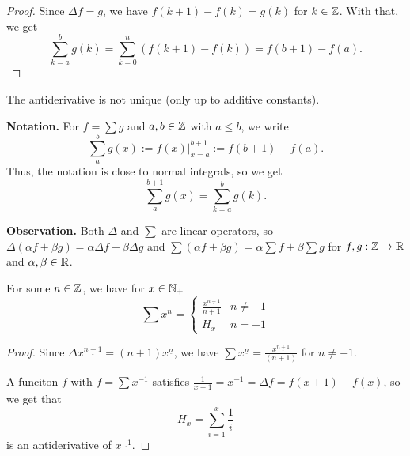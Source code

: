 \documentclass[language=english]{../../Template/TemplateLecture}
\begin{document}
\begin{proof}
    Since $\Delta f = g$, we have $f(k+1) - f(k) = g(k)$ for $k \in \mathbb{Z}$. With that, we get 
    \begin{equation}
        \sum_{k = a}^b g(k) = \sum_{k = 0}^n (f(k+1) - f(k)) = f(b+1) - f(a).
    \end{equation}
\end{proof}

The antiderivative is not unique (only up to additive constants).

\textbf{Notation.} For $f = \sum g$ and $a, b \in \mathbb{Z}$ with $a \leq b$, we write
\begin{equation}
    \sum_a^b g(x) := f(x)\Big|_{x = a}^{b + 1} := f(b+1) - f(a).
\end{equation}
Thus, the notation is close to normal integrals, so we get 
\begin{equation}
    \sum_a^{b+1} g(x) = \sum_{k = a}^b g(k).
\end{equation}




\textbf{Observation.} Both $\Delta$ and $\sum$ are linear operators, so $\Delta(\alpha f + \beta g) = \alpha \Delta f + \beta \Delta g$ and $\sum(\alpha f + \beta g) = \alpha\sum f + \beta\sum g$ for $f, g: \mathbb{Z} \to \mathbb{R}$ and $\alpha,\beta \in \mathbb{R}$.

\begin{prop}
    For some $n \in \mathbb{Z}$, we have for $x \in \mathbb{N}_+$ 
    \begin{equation}
        \sum x^{\underline{n}} = \begin{cases}
            \frac{x^{\underline{n+1}}}{n+1} & n \neq -1 \\
            H_x & n = -1
        \end{cases}
    \end{equation}
\end{prop}

\begin{proof}
    Since $\Delta x^{\underline{n+1}} = (n+1)x^{\underline{n}}$, we have $\sum x^{\underline{n}} = \frac{x^{\underline{n+1}}}{(n+1)}$ for $n \neq -1$.

    A funciton $f$ with $f = \sum x^{\underline{-1}}$ satisfies $\frac{1}{x+1} = x^{\underbar{-1}} = \Delta f = f(x+1) - f(x)$, so we get that 
    \begin{equation}
        H_x = \sum_{i = 1}^x \frac{1}{i}
    \end{equation}
    is an antiderivative of $x^{\underline{-1}}$.
\end{proof}
\end{document}
